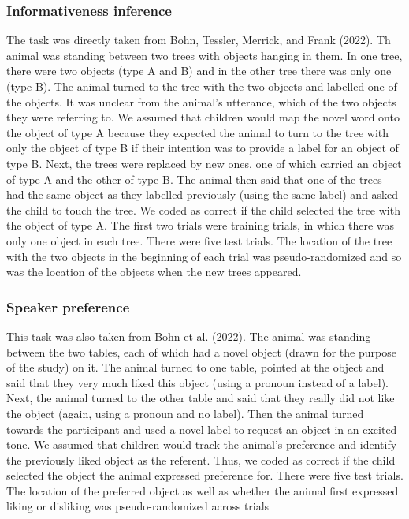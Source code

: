 \documentclass[
  english,
  man,floatsintext]{apa6}
\begin{document}
\hypertarget{informativeness-inference}{%
\subsubsection{Informativeness inference}\label{informativeness-inference}}

The task was directly taken from Bohn, Tessler, Merrick, and Frank (2022). Th animal was standing between two trees with objects hanging in them. In one tree, there were two objects (type A and B) and in the other tree there was only one (type B). The animal turned to the tree with the two objects and labelled one of the objects. It was unclear from the animal's utterance, which of the two objects they were referring to. We assumed that children would map the novel word onto the object of type A because they expected the animal to turn to the tree with only the object of type B if their intention was to provide a label for an object of type B. Next, the trees were replaced by new ones, one of which carried an object of type A and the other of type B. The animal then said that one of the trees had the same object as they labelled previously (using the same label) and asked the child to touch the tree. We coded as correct if the child selected the tree with the object of type A. The first two trials were training trials, in which there was only one object in each tree. There were five test trials. The location of the tree with the two objects in the beginning of each trial was pseudo-randomized and so was the location of the objects when the new trees appeared.

\hypertarget{speaker-preference}{%
\subsubsection{Speaker preference}\label{speaker-preference}}

This task was also taken from Bohn et al. (2022). The animal was standing between the two tables, each of which had a novel object (drawn for the purpose of the study) on it. The animal turned to one table, pointed at the object and said that they very much liked this object (using a pronoun instead of a label). Next, the animal turned to the other table and said that they really did not like the object (again, using a pronoun and no label). Then the animal turned towards the participant and used a novel label to request an object in an excited tone. We assumed that children would track the animal's preference and identify the previously liked object as the referent. Thus, we coded as correct if the child selected the object the animal expressed preference for. There were five test trials. The location of the preferred object as well as whether the animal first expressed liking or disliking was pseudo-randomized across trials
\end{document}
